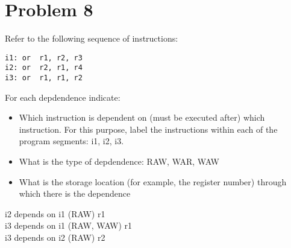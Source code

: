 \documentclass[10pt,letterpaper]{article}
\begin{document}
\section{Problem 8}
Refer to the following sequence of instructions:
\begin{lstlisting}
i1: or 	r1, r2, r3
i2: or 	r2, r1, r4
i3: or 	r1, r1, r2
\end{lstlisting}
For each depdendence indicate:
\begin{itemize}
\item Which instruction is dependent on (must be executed after) which instruction. For this purpose, label the instructions within each of the program segments: i1, i2, i3.
\item What is the type of depdendence: RAW, WAR, WAW
\item What is the storage location (for example, the register number) through which there is the dependence
\end{itemize}
i2 depends on i1 (RAW) r1 \\
i3 depends on i1 (RAW, WAW) r1 \\
i3 depends on i2 (RAW) r2

\end{document}
